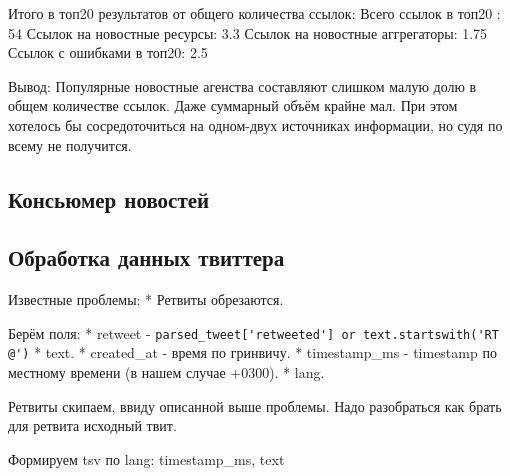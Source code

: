         Итого в топ20 результатов от общего количества ссылок:
        Всего ссылок в топ20 : 54%
        Ссылок на новостные ресурсы: 3.3%
        Ссылок на новостные аггрегаторы: 1.75%
        Ссылок с ошибками в топ20: 2.5%

        Вывод:
        Популярные новостные агенства составляют слишком малую долю в общем количестве ссылок. Даже суммарный объём крайне мал. При этом хотелось бы сосредоточиться на одном-двух источниках информации, но судя по всему не получится.


    \subsection{Консьюмер новостей}

    \subsection{Обработка данных твиттера}
        Известные проблемы: 
        * Ретвиты обрезаются.

        Берём поля:
        * retweet - \lstinline{parsed_tweet['retweeted'] or text.startswith('RT @')}
        * text.
        * created\_at - время по гринвичу.
        * timestamp\_ms - timestamp по местному времени (в нашем случае +0300).
        * lang.

        Ретвиты скипаем, ввиду описанной выше проблемы. Надо разобраться как брать для ретвита исходный твит.

        Формируем tsv по lang:
        timestamp\_ms, text

